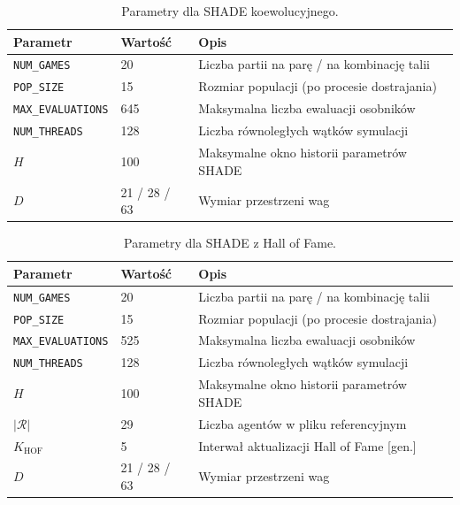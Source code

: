 \begin{table}[ht]
\centering
\caption{Parametry dla SHADE koewolucyjnego.}
\label{tab:params_coev}
\begin{tabular}{lll}
\toprule
Parametr & Wartość & Opis \\
\midrule
\texttt{NUM\_GAMES}       & 20           & Liczba partii na parę / na kombinację talii \\
\texttt{POP\_SIZE}        & 15           & Rozmiar populacji (po procesie dostrajania) \\
\texttt{MAX\_EVALUATIONS} & 645          & Maksymalna liczba ewaluacji osobników \\
\texttt{NUM\_THREADS}     & 128          & Liczba równoległych wątków symulacji \\
$H$                       & 100          & Maksymalne okno historii parametrów SHADE \\
$D$                       & 21 / 28 / 63 & Wymiar przestrzeni wag \\
\bottomrule
\end{tabular}
\end{table}

\begin{table}[ht]
\centering
\caption{Parametry dla SHADE z Hall of Fame.}
\label{tab:params_hof}
\begin{tabular}{lll}
\toprule
Parametr & Wartość & Opis \\
\midrule
\texttt{NUM\_GAMES}          & 20           & Liczba partii na parę / na kombinację talii \\
\texttt{POP\_SIZE}           & 15           & Rozmiar populacji (po procesie dostrajania) \\
\texttt{MAX\_EVALUATIONS}    & 525          & Maksymalna liczba ewaluacji osobników \\
\texttt{NUM\_THREADS}        & 128          & Liczba równoległych wątków symulacji \\
$H$                          & 100          & Maksymalne okno historii parametrów SHADE \\
$|\mathcal{R}|$              & 29           & Liczba agentów w pliku referencyjnym \\
$K_{\text{HOF}}$             & 5            & Interwał aktualizacji Hall of Fame [gen.] \\
$D$                          & 21 / 28 / 63 & Wymiar przestrzeni wag \\
\bottomrule
\end{tabular}
\end{table}


